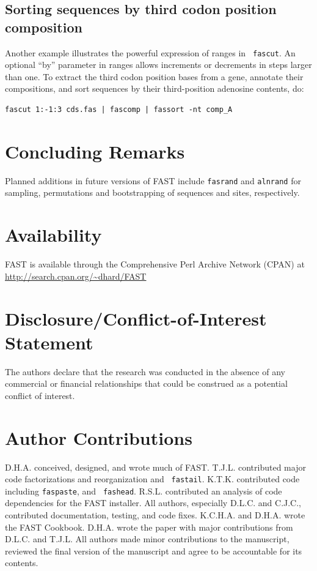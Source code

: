 \documentclass{frontiersSCNS} %
\begin{document}
\subsection{Sorting sequences by third codon position composition}

Another example illustrates the powerful expression of ranges in {\tt
  fascut}. An optional ``by'' parameter in ranges allows increments or
decrements in steps larger than one. To extract the third codon
position bases from a gene, annotate their compositions, and sort
sequences by their third-position adenosine contents, do:

\begin{verbatim}
fascut 1:-1:3 cds.fas | fascomp | fassort -nt comp_A
\end{verbatim}

\section{Concluding Remarks}

Planned additions in future versions of FAST include {\tt fasrand} and
{\tt alnrand} for sampling, permutations and bootstrapping of
sequences and sites, respectively.

\section*{Availability}

FAST is available through the Comprehensive Perl Archive Network
(CPAN) at \url{http://search.cpan.org/~dhard/FAST}

\section*{Disclosure/Conflict-of-Interest Statement}

The authors declare that the research was conducted in the absence of
any commercial or financial relationships that could be construed as a
potential conflict of interest.

\section*{Author Contributions}

D.H.A. conceived, designed, and wrote much of FAST. T.J.L. contributed
major code factorizations and reorganization and {\tt
  fastail}. K.T.K. contributed code including {\tt faspaste}, and {\tt
  fashead}. R.S.L. contributed an analysis of code dependencies for
the FAST installer. All authors, especially D.L.C. and C.J.C.,
contributed documentation, testing, and code fixes. K.C.H.A. and
D.H.A. wrote the FAST Cookbook. D.H.A. wrote the paper with major
contributions from D.L.C. and T.J.L. All authors made minor
contributions to the manuscript, reviewed the final version of the
manuscript and agree to be accountable for its contents.
\end{document}
